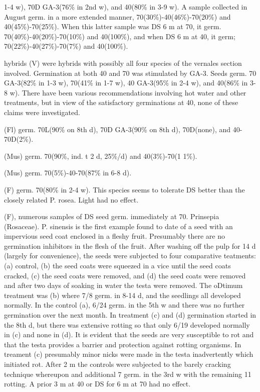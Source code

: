 \begin{description}
1-4 w), 70D GA-3(76\% in 2nd w), and 40(80\% in 3-9 w). A sample collected in August
germ. in a more extended manner, 70(30\%)-40(46\%)-70(20\%) and 40(45\%)-70(25\%).
When this latter sample was DS 6 m at 70, it germ. 70(40\%)-40(20\%)-70(10\%) and
40(100\%), and when DS 6 m at 40, it germ; 70(22\%)-40(27\%)-70(7\%) and 40(100\%).
\item[P. vernales] hybrids (V) were hybrids with possibly all four species of the
vernales section involved. Germination at both 40 and 70 was stimulated by GA-3.
Seeds germ. 70 GA-3(82\% in 1-3 w), 70(41\% in 1-7 w), 40 GA-3(95\% in 2-4 w), and
40(86\% in 3-8 w). There have been various recommendations involving hot water and
other treatments, but in view of the satisfactory germinations at 40, none of these
claims were investigated.
\item[P. verticillata] (Fl) germ. 70L(90\% on 8th d), 70D GA-3(90\% on 8th d),
70D(none), and 40-70D(2\%).
\item[P. vialli] (Mus) germ. 70(90\%, ind. t 2 d, 25\%/d) and 40(3\%)-70(1 1\%).
\item[P. violacea] (Mus) germ. 70(5\%)-40-70(87\% in 6-8 d).

\item[P. warshenewskiana] (F) germ. 70(80\% in 2-4 w). This species seems to tolerate
DS better than the closely related P. rosea. Light had no effect.
\item[P. yargongensis] (F), numerous samples of DS seed germ. immediately at 70.
Prinsepia (Rosaceae). P. sinensis is the first example found to date of a
seed with an impervious seed coat enclosed in a fleshy fruit. Presumably there are no
germination inhibitors in the flesh of the fruit. After washing off the pulp for 14 d
(largely for convenience), the seeds were subjected to four comparative teatments: (a)
control, (b) the seed coats were squeezed in a vice until the seed coats cracked, (c)
the seed coats were removed, and (d) the seed coats were removed and after two
days of soaking in water the testa were removed. The oDtimum treatment was (b)
where 7/8 germ. in 8-14 d, and the seedlings all developed normally. In the control
(a), 6/24 germ. in the 5th w and there was no further germination over the next month.
In treatment (c) and (d) germination started in the 8th d, but there was extensive rotting
so that only 6/19 developed normally in (c) and none in (d). It is evident that the seeds
are very susceptible to rot and that the testa provides a barrier and protection against
rotting organisms. In treament (c) presumably minor nicks were made in the testa
inadvertently which initiated rot. After 2 m the controls were subjected to the barely
cracking technique whereupon and additional 7 germ. in the 3rd w with the remaining
11 rotting. A prior 3 m at 40 or DS for 6 m at 70 had no effect.


\end{description}
